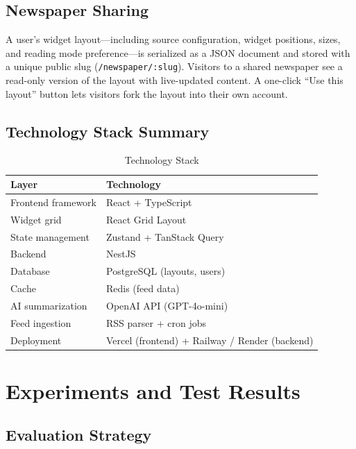 \documentclass[14pt]{article}
\begin{document}
\subsection{Newspaper Sharing}

A user's widget layout---including source configuration, widget positions, sizes, and reading mode preference---is serialized as a JSON document and stored with a unique public slug (\texttt{/newspaper/:slug}). Visitors to a shared newspaper see a read-only version of the layout with live-updated content. A one-click ``Use this layout'' button lets visitors fork the layout into their own account.

\subsection{Technology Stack Summary}

\begin{table}[H]
\centering
\caption{Technology Stack}
\renewcommand{\arraystretch}{1.25}
\begin{tabularx}{\textwidth}{l X}
\toprule
\textbf{Layer} & \textbf{Technology} \\
\midrule
Frontend framework    & React + TypeScript \\
Widget grid           & React Grid Layout \\
State management      & Zustand + TanStack Query \\
Backend               & NestJS \\
Database              & PostgreSQL (layouts, users) \\
Cache                 & Redis (feed data) \\
AI summarization      & OpenAI API (GPT-4o-mini) \\
Feed ingestion        & RSS parser + cron jobs \\
Deployment            & Vercel (frontend) + Railway / Render (backend) \\
\bottomrule
\end{tabularx}
\end{table}

\section{Experiments and Test Results}

\subsection{Evaluation Strategy}
\end{document}
